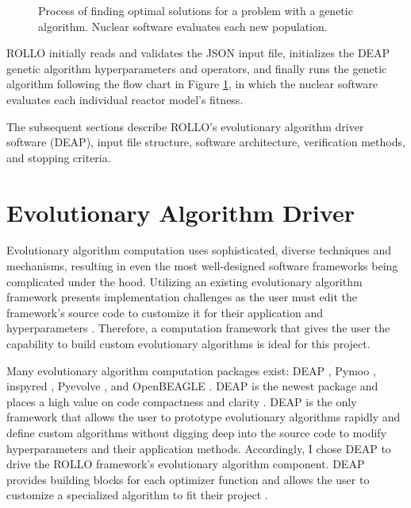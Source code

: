 \begin{figure}[htbp]
    \caption{Process of finding optimal solutions for a problem with a 
    genetic algorithm. Nuclear software evaluates each new population.}
    \label{fig:genetic_alg_nuclear}
\end{figure}
\gls{ROLLO} initially reads and validates the JSON input 
file, initializes the \gls{DEAP} \cite{fortin_deap_2012} genetic algorithm 
hyperparameters and operators, and finally runs the genetic algorithm following 
the flow chart in Figure \ref{fig:genetic_alg_nuclear}, in which the nuclear 
software evaluates each individual reactor model's fitness. 

The subsequent sections describe \gls{ROLLO}'s evolutionary algorithm driver 
software (\gls{DEAP}), input file structure, software architecture, verification 
methods, and stopping criteria. 

\section{Evolutionary Algorithm Driver}
Evolutionary algorithm computation uses sophisticated, diverse techniques 
and mechanisms, resulting in even the most well-designed software frameworks 
being complicated under the hood. 
Utilizing an existing evolutionary algorithm framework presents implementation 
challenges as the user must edit the framework's source code to customize it for their 
application and hyperparameters \cite{fortin_deap_2012}. 
Therefore, a computation framework that gives the user the capability to build 
custom evolutionary algorithms is ideal for this project.

Many evolutionary algorithm computation packages exist: 
\gls{DEAP} \cite{fortin_deap_2012}, Pymoo \cite{blank_pymoo_2020}, inspyred 
\cite{garrett_inspyred_2014}, Pyevolve \cite{perone_pyevolve_2009}, and 
OpenBEAGLE \cite{gagne_open_2002}.
\gls{DEAP} is the newest package and places a high value on code 
compactness and clarity \cite{fortin_deap_2012}. 
\gls{DEAP} is the only framework that allows the user to prototype evolutionary 
algorithms rapidly and define custom algorithms without digging deep into 
the source code to modify hyperparameters and their application methods.
Accordingly, I chose \gls{DEAP} to drive the \gls{ROLLO} framework's 
evolutionary algorithm component. 
\gls{DEAP} provides building blocks for each optimizer function and allows the 
user to customize a specialized algorithm to fit their project \cite{fortin_deap_2012}.

